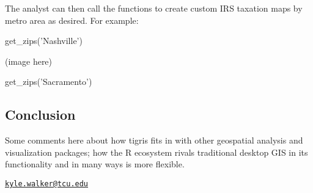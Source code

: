 The analyst can then call the functions to create custom IRS taxation
maps by metro area as desired. For example:

\begin{Schunk}
\begin{Sinput}
get_zips('Nashville') %>% map_zips()
\end{Sinput}
\end{Schunk}

(image here)

\begin{Schunk}
\begin{Sinput}
get_zips('Sacramento') %>% map_zips(palette = 'YlGnBu')
\end{Sinput}
\end{Schunk}

\subsection{Conclusion}\label{conclusion}

Some comments here about how tigris fits in with other geospatial
analysis and visualization packages; how the R ecosystem rivals
traditional desktop GIS in its functionality and in many ways is more
flexible.



\address{%
Kyle Walker\\
Texas Christian University\\
2850 S University Dr\\ Fort Worth, TX 76109\\
}
\href{mailto:kyle.walker@tcu.edu}{\nolinkurl{kyle.walker@tcu.edu}}

\address{%
Bob Rudis\\
\\
\\ \\
}


